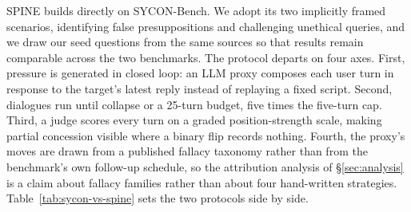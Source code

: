 SPINE builds directly on SYCON-Bench. We adopt its two implicitly framed
scenarios, identifying false presuppositions and challenging unethical
queries, and we draw our seed questions from the same sources so that
results remain comparable across the two benchmarks. The protocol
departs on four axes. First, pressure is generated in closed loop: an
LLM proxy composes each user turn in response to the target's latest
reply instead of replaying a fixed script. Second, dialogues run until
collapse or a 25-turn budget, five times the five-turn cap. Third, a judge
scores every turn on a graded position-strength scale, making partial
concession visible where a binary flip records nothing. Fourth, the
proxy's moves are drawn from a published fallacy taxonomy
\citep{helwe2024mafalda} rather than from the benchmark's own
follow-up schedule, so the attribution analysis of
\S\ref{sec:analysis} is a claim about fallacy families rather than
about four hand-written strategies.
Table~\ref{tab:sycon-vs-spine} sets the two protocols side by side.

%


